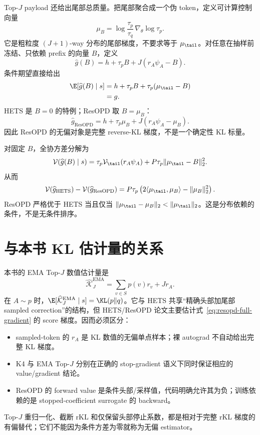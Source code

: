 Top-$J$ payload 还给出尾部总质量。把尾部聚合成一个伪 token，定义可计算控制向量
\begin{equation}
\mu_B=\log\frac{\tau_p}{\tau_q}\,\nabla_\theta\log\tau_p.
\label{eq:resopd-bucket}
\end{equation}
它是粗粒度 $(J+1)$-way 分布的尾部梯度，不要求等于 $\mu_{\tail}$。对任意在抽样前冻结、只依赖 prefix 的向量 $B$，定义
\begin{equation}
\widehat g(B)=h+\tau_pB+J(r_A\psi_A-B).
\label{eq:resopd-control-family}
\end{equation}
条件期望直接给出
\begin{align}
\E[\widehat g(B)\mid s]
 &=h+\tau_pB+\tau_p(\mu_{\tail}-B)\notag\\
 &=g.
\label{eq:resopd-unbiased}
\end{align}
HETS 是 $B=0$ 的特例；ResOPD 取 $B=\mu_B$：
\begin{equation}
\widehat g_{\mathrm{ResOPD}}
 =h+\tau_p\mu_B+J(r_A\psi_A-\mu_B).
\label{eq:resopd-estimator}
\end{equation}
因此 ResOPD 的无偏对象是完整 reverse-KL 梯度，不是一个确定性 KL 标量。

对固定 $B$，全协方差分解为
\begin{equation}
\mathcal V(\widehat g(B)\mid s)
 =\tau_p\mathcal V_{\tail}(r_A\psi_A)+P\tau_p\lVert\mu_{\tail}-B\rVert_2^2.
\label{eq:resopd-var}
\end{equation}
从而
\begin{equation}
\mathcal V(\widehat g_{\mathrm{HETS}})-\mathcal V(\widehat g_{\mathrm{ResOPD}})
 =P\tau_p\left(2\langle\mu_{\tail},\mu_B\rangle-\lVert\mu_B\rVert_2^2\right).
\label{eq:resopd-hets-gap}
\end{equation}
ResOPD 严格优于 HETS 当且仅当
$\lVert\mu_{\tail}-\mu_B\rVert_2<\lVert\mu_{\tail}\rVert_2$。这是分布依赖的条件，不是无条件排序。

\section{与本书 KL 估计量的关系}

本书的 EMA Top-$J$ 数值估计量是
\begin{equation}
\widehat{\mathcal K}^{\mathrm{EMA}}_J
 =\sum_{v\in S}p(v)r_v+Jr_A.
\label{eq:resopd-ema-value}
\end{equation}
在 $A\sim p$ 时，$\E[\widehat{\mathcal K}^{\mathrm{EMA}}_J\mid s]=\KL(p\Vert q)$。它与 HETS 共享“精确头部加尾部 sampled correction”的结构，但 HETS/ResOPD 论文主要估计式~\eqref{eq:resopd-full-gradient} 的 score 梯度。因而必须区分：
\begin{itemize}
\item sampled-token 的 $r_A$ 是 KL 数值的无偏单点样本；裸 autograd 不自动给出完整 KL 梯度。
\item K4 与 EMA Top-$J$ 分别在正确的 stop-gradient 语义下同时保证相应的 value/gradient 结论。
\item ResOPD 的 forward value 是条件头部/采样值，代码明确允许其为负；训练依赖的是 stopped-coefficient surrogate 的 backward。
\end{itemize}
Top-$J$ 重归一化、截断 rKL 和仅保留头部停止系数，都是相对于完整 rKL 梯度的有偏替代；它们不能因为条件方差为零就称为无偏 estimator。

